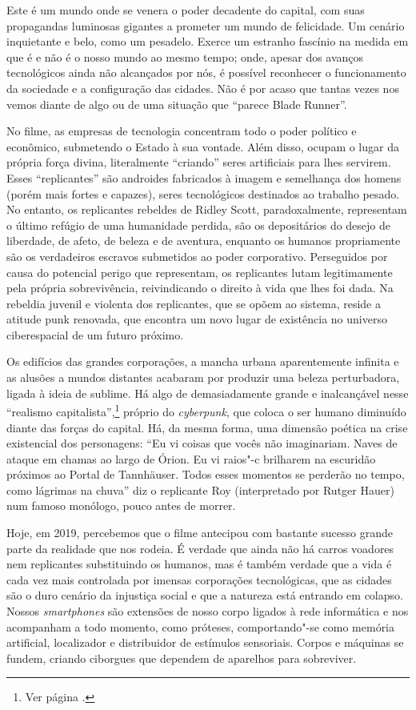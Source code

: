 Este é um mundo onde se venera o poder decadente do capital, com suas
propagandas luminosas gigantes a prometer um mundo de felicidade. Um
cenário inquietante e belo, como um pesadelo. Exerce um estranho
fascínio na medida em que é e não é o nosso mundo ao mesmo tempo; onde,
apesar dos avanços tecnológicos ainda não alcançados por nós, é possível
reconhecer o funcionamento da sociedade e a configuração das cidades.
Não é por acaso que tantas vezes nos vemos diante de algo ou de uma
situação que ``parece Blade Runner''.

No filme, as empresas de tecnologia concentram todo o poder político e \label{replicantes}
econômico, submetendo o Estado à sua vontade. Além disso, ocupam o lugar
da própria força divina, literalmente ``criando'' seres artificiais para
lhes servirem. Esses ``replicantes'' são androides fabricados à imagem e
semelhança dos homens (porém mais fortes e capazes), seres
tecnológicos destinados ao trabalho pesado. No entanto, os replicantes rebeldes
de Ridley Scott, paradoxalmente, representam o último refúgio de uma
humanidade perdida, são os depositários do desejo de liberdade, de
afeto, de beleza e de aventura, enquanto os humanos propriamente são os
verdadeiros escravos submetidos ao poder corporativo. Perseguidos por
causa do potencial perigo que representam, os replicantes lutam legitimamente pela
própria sobrevivência, reivindicando o direito à vida que lhes foi dada.
Na rebeldia juvenil e violenta dos replicantes, que se opõem ao sistema, reside a atitude punk renovada, que encontra um novo lugar de existência no
universo ciberespacial de um futuro próximo.

Os edifícios das grandes corporações, a mancha urbana aparentemente infinita e as alusões a mundos distantes acabaram por produzir uma beleza perturbadora, ligada à ideia de sublime. Há algo de demasiadamente grande e inalcançável nesse ``realismo capitalista'',\footnote{Ver página \pageref{realismo}.} próprio do \emph{cyberpunk}, que coloca o ser humano diminuído diante das forças do capital. Há, da mesma forma, uma dimensão poética na crise existencial dos personagens: ``Eu vi coisas que vocês não imaginariam. Naves de ataque em chamas ao largo de Órion. Eu vi raios"-c brilharem na escuridão próximos ao Portal de Tannhäuser. Todos esses momentos se perderão no tempo, como lágrimas na chuva'' diz o replicante Roy (interpretado por Rutger Hauer) num famoso monólogo, pouco antes de morrer.

Hoje, em 2019, percebemos que o filme antecipou com bastante sucesso grande parte da realidade que nos rodeia. É verdade que ainda não há carros voadores nem replicantes substituindo os humanos, mas é também verdade que a vida é cada vez mais controlada por imensas corporações tecnológicas, que as cidades são o duro cenário da injustiça social e que a natureza está entrando em colapso. Nossos \emph{smartphones} são extensões de nosso corpo ligados à rede informática e nos acompanham a todo momento, como próteses, comportando"-se como memória artificial, localizador e distribuidor de estímulos sensoriais. Corpos e máquinas se fundem, criando ciborgues que dependem de aparelhos para sobreviver. 

